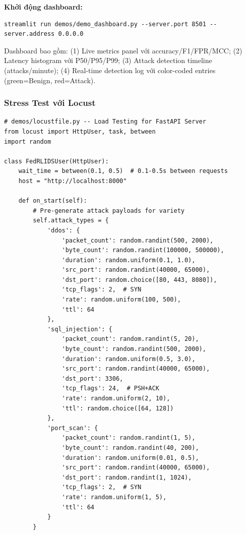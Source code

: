 \documentclass[12pt,a4paper]{article}
\begin{document}
\textbf{Khởi động dashboard:}
\begin{verbatim}
streamlit run demos/demo_dashboard.py --server.port 8501 --server.address 0.0.0.0
\end{verbatim}

Dashboard bao gồm: (1) Live metrics panel với accuracy/F1/FPR/MCC; (2) Latency histogram với P50/P95/P99; (3) Attack detection timeline (attacks/minute); (4) Real-time detection log với color-coded entries (green=Benign, red=Attack).

\subsubsection{Stress Test với Locust}

\begin{lstlisting}[caption=Locust Stress Test, label=lst:locust]
# demos/locustfile.py -- Load Testing for FastAPI Server
from locust import HttpUser, task, between
import random

class FedRLIDSUser(HttpUser):
    wait_time = between(0.1, 0.5)  # 0.1-0.5s between requests
    host = "http://localhost:8000"

    def on_start(self):
        # Pre-generate attack payloads for variety
        self.attack_types = {
            'ddos': {
                'packet_count': random.randint(500, 2000),
                'byte_count': random.randint(100000, 500000),
                'duration': random.uniform(0.1, 1.0),
                'src_port': random.randint(40000, 65000),
                'dst_port': random.choice([80, 443, 8080]),
                'tcp_flags': 2,  # SYN
                'rate': random.uniform(100, 500),
                'ttl': 64
            },
            'sql_injection': {
                'packet_count': random.randint(5, 20),
                'byte_count': random.randint(500, 2000),
                'duration': random.uniform(0.5, 3.0),
                'src_port': random.randint(40000, 65000),
                'dst_port': 3306,
                'tcp_flags': 24,  # PSH+ACK
                'rate': random.uniform(2, 10),
                'ttl': random.choice([64, 128])
            },
            'port_scan': {
                'packet_count': random.randint(1, 5),
                'byte_count': random.randint(40, 200),
                'duration': random.uniform(0.01, 0.5),
                'src_port': random.randint(40000, 65000),
                'dst_port': random.randint(1, 1024),
                'tcp_flags': 2,  # SYN
                'rate': random.uniform(1, 5),
                'ttl': 64
            }
        }


\end{lstlisting}
\end{document}
